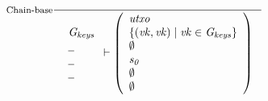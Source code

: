 \begin{figure}
  \begin{equation}
    \label{eq:rule:chain-base}
    \inference[Chain-base]
    {}
    {{\begin{array}{l}
         \Gkeys\\
         \wcard\\
         \wcard\\
         \wcard
      \end{array}}
      \vdash
      \left(
        \begin{array}{l}
          \var{utxo}\\
          \var{\{ (\var{vk}, \var{vk}) \mid \var{vk} \in \Gkeys\}}\\
          \emptyset\\
          \var{s_0}\\
          \emptyset\\
          \emptyset
        \end{array}
      \right)
    }
  \end{equation}


\end{figure}

